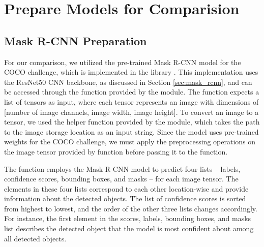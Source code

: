 \section{Prepare Models for Comparision}  \label{sec:prep_models}

\subsection{Mask R-CNN Preparation} \label{subsec:mrcnn_prep}

For our comparison, we utilized the pre-trained Mask R-CNN model for the COCO challenge, which is implemented in the  library \cite{pytorch_mrcnn}. This implementation uses the ResNet50 CNN backbone, as discussed in Section \ref{sec:mask_rcnn}, and can be accessed through the  function provided by the  module. The function expects a list of tensors as input, where each tensor represents an image with dimensions of [number of image channels, image width, image height]. To convert an image to a tensor, we used the  helper function provided by the  module, which takes the path to the image storage location as an input string. Since the model uses pre-trained weights for the COCO challenge, we must apply the preprocessing operations on the image tensor provided by  function before passing it to the  function.

The  function employs the Mask R-CNN model to predict four lists -- labels, confidence scores, bounding boxes, and masks -- for each image tensor. The elements in these four lists correspond to each other location-wise and provide information about the detected objects. The list of confidence scores is sorted from highest to lowest, and the order of the other three lists changes accordingly. For instance, the first element in the scores, labels, bounding boxes, and masks list describes the detected object that the model is most confident about among all detected objects. 

